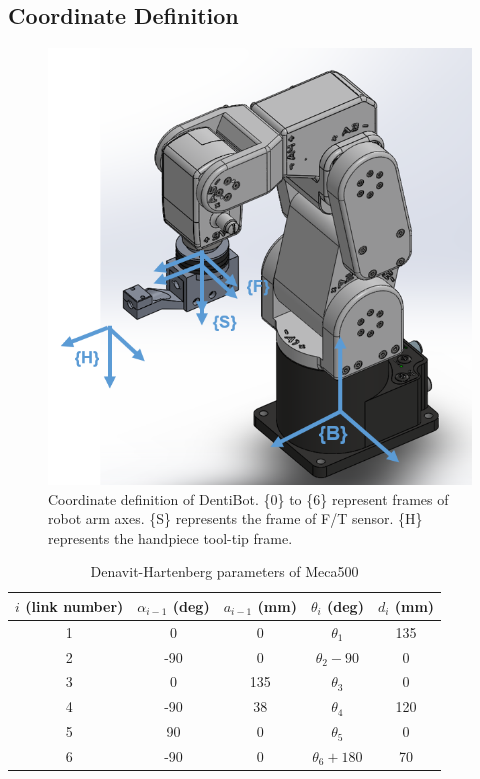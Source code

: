\subsection*{Coordinate Definition}
\begin{figure}[htbp]
\begin{center}
\includegraphics[width=0.85\linewidth]{Images/Coordinates.png}
\caption{
Coordinate definition of DentiBot. \{0\} to \{6\} represent frames of  robot arm axes. \{S\} represents the frame of F/T sensor. \{H\} represents the handpiece tool-tip frame.
}\label{fig:frames}
\end{center}
\end{figure} 

\begin{table}[htbp]
\centering
\caption{Denavit-Hartenberg parameters of Meca500}
\label{tab:DHtable}
\begin{tabular}{ccccc} 
\hline \hline
$i$ (link number)		&$\alpha _{i-1}$ (deg)	&$a_{i-1}$ (mm)	& $\theta _i$ (deg)			&$d_i$ (mm)	\\
\hline
1   					&0    					&0				&$\theta _1$				&135 \\
2   					&-90   					&0				&$\theta _2-90$				&0 \\
3  						&0    					&135			&$\theta _3$ 				&0 \\
4   					&-90    				&38				&$\theta _4$ 				&120 \\
5   					&90   					&0				&$\theta _5$ 				&0 \\
6						&-90  					&0				&$\theta _6+180$ 				&70 \\
\hline\hline
\end{tabular}
\end{table}
